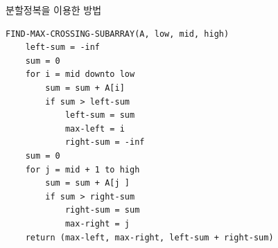 \documentclass[10pt]{beamer}
\begin{document}
\begin{frame}[fragile]{분할정복을 이용한 방법}
    \begin{lstlisting}[style = CppStyle]
    FIND-MAX-CROSSING-SUBARRAY(A, low, mid, high)
    left-sum = -inf
    sum = 0
    for i = mid downto low
        sum = sum + A[i]
        if sum > left-sum
            left-sum = sum
            max-left = i
            right-sum = -inf
    sum = 0
    for j = mid + 1 to high
        sum = sum + A[j ]
        if sum > right-sum
            right-sum = sum
            max-right = j
    return (max-left, max-right, left-sum + right-sum)
    \end{lstlisting}
\end{frame}    
\end{document}
